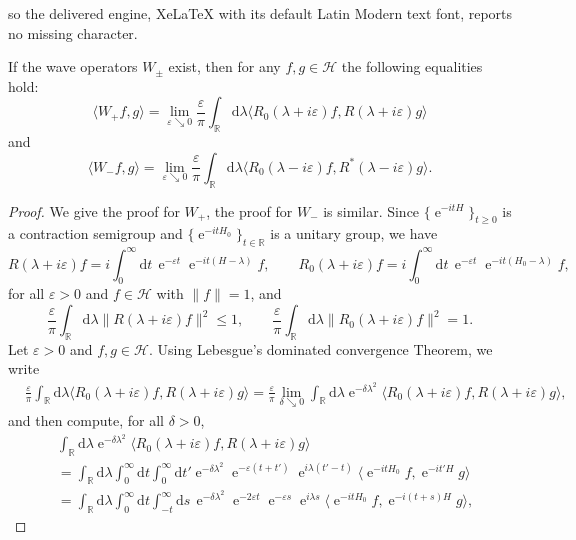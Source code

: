 \documentclass[10pt,a4paper]{amsart}
\def\H{\mathcal H}
\def\R{\mathbb R}
\def\d{\mathrm{d}}
\def\e{\mathop{\mathrm{e}}\nolimits}
\begin{document}
so the delivered engine, XeLaTeX with its default Latin Modern text font, reports no missing character.
\begin{Lemma}\label{lem_statio}
If the wave operators $W_\pm$ exist, then for any $f, g\in \H$ the following equalities hold:
$$
\langle W_+ f,g\rangle 
=  \lim_{\varepsilon\searrow 0}\frac{\varepsilon}{\pi} \int_{\R}\d \lambda 
\langle R_0(\lambda+i \varepsilon)f, R(\lambda + i \varepsilon) g\rangle
$$
and 
$$
\langle W_- f,g\rangle
=  \lim_{\varepsilon\searrow 0}\frac{\varepsilon}{\pi} \int_{\R}\d \lambda 
\langle R_0(\lambda- i \varepsilon)f, R^*(\lambda - i \varepsilon) g\rangle.
$$
\end{Lemma}

\begin{proof}
We give the proof for $W_+$, the proof for $W_-$ is similar. 
Since $\{ \e^{-itH} \}_{ t \ge 0 }$ is a contraction semigroup and $\{ \e^{-itH_0} \}_{ t \in\R }$ is a unitary group, we have 
\begin{equation*}
R(\lambda+i\varepsilon)f=i\int_0^\infty \d t\, \e^{-\varepsilon t}\e^{-it(H-\lambda)}f, \qquad R_0(\lambda+i\varepsilon)f=i\int_0^\infty \d t\, \e^{-\varepsilon t}\e^{-it(H_0-\lambda)}f,
\end{equation*}
for all $\varepsilon>0$ and $f\in\H$ with $\|f\|=1$, and 
\begin{equation*}
\frac{\varepsilon}{\pi} \int_{\R}\d \lambda \|R(\lambda+i\varepsilon)f\|^2\le1, \qquad \frac{\varepsilon}{\pi} \int_{\R}\d \lambda \|R_0(\lambda+i\varepsilon)f\|^2=1.
\end{equation*}
Let $\varepsilon>0$ and $f,g\in\H$. Using Lebesgue's dominated convergence Theorem, we write
\begin{align}\label{eq:int-formula}
&\frac{\varepsilon}{\pi} \int_{\R}\d \lambda \langle R_0(\lambda+i \varepsilon)f, R(\lambda + i \varepsilon) g\rangle =\frac{\varepsilon}{\pi}\lim_{\delta\searrow 0}  \int_{\R}\d \lambda \e^{-\delta\lambda^2} \langle R_0(\lambda+i \varepsilon)f, R(\lambda + i \varepsilon) g\rangle , 
\end{align}
and then compute, for all $\delta>0$,
\begin{align*}
&\int_{\R}\d \lambda \e^{-\delta\lambda^2} \langle R_0(\lambda+i \varepsilon)f, R(\lambda + i \varepsilon) g\rangle \\
&= \int_{\R}\d \lambda \int_0^\infty \d t \int_0^\infty \d t' \e^{-\delta\lambda^2} \e^{-\varepsilon (t+t')} \e^{i\lambda(t'-t)} \langle \e^{-itH_0}f, \e^{-it'H} g\rangle \\
&= \int_{\R}\d \lambda \int_0^\infty \d t \int_{-t}^\infty \d s \,  \e^{-\delta\lambda^2} \e^{-2\varepsilon t} \e^{-\varepsilon s} \e^{i\lambda s} \langle \e^{-itH_0}f, \e^{-i(t+s)H} g\rangle ,

\end{align*}
\end{proof}
\end{document}
